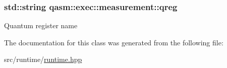 \subsubsection[{\texorpdfstring{qreg}{qreg}}]{\setlength{\rightskip}{0pt plus 5cm}std\+::string qasm\+::exec\+::measurement\+::qreg}\hypertarget{classqasm_1_1exec_1_1measurement_acd8ed10227ce8755b6449959c508e023}{}\label{classqasm_1_1exec_1_1measurement_acd8ed10227ce8755b6449959c508e023}
Quantum register name 

The documentation for this class was generated from the following file\+:\begin{DoxyCompactItemize}
\item 
src/runtime/\hyperlink{runtime_8hpp}{runtime.\+hpp}\end{DoxyCompactItemize}
